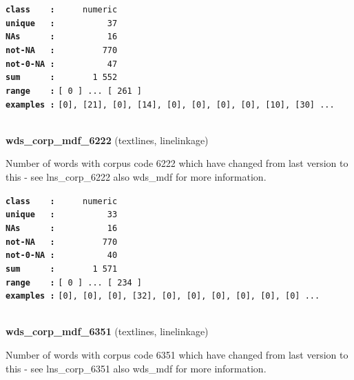\documentclass[]{article}
\begin{document}
\textbf{\texttt{class\ \ \ \ :}} \texttt{~~~~~numeric}\\
\textbf{\texttt{unique\ \ \ :}} \texttt{~~~~~~~~~~37}\\
\textbf{\texttt{NAs\ \ \ \ \ \ :}} \texttt{~~~~~~~~~~16}\\
\textbf{\texttt{not-NA\ \ \ :}} \texttt{~~~~~~~~~770}\\
\textbf{\texttt{not-0-NA\ :}} \texttt{~~~~~~~~~~47}\\
\textbf{\texttt{sum\ \ \ \ \ \ :}} \texttt{~~~~~~~1~552}\\
\textbf{\texttt{range\ \ \ \ :}}
\texttt{{[}\ 0\ {]}\ ...\ {[}\ 261\ {]}}\\
\textbf{\texttt{examples\ :}}
\texttt{{[}0{]},\ {[}21{]},\ {[}0{]},\ {[}14{]},\ {[}0{]},\ {[}0{]},\ {[}0{]},\ {[}0{]},\ {[}10{]},\ {[}30{]}\ ...}\\

~

\textbf{wds\_corp\_mdf\_6222} (textlines, linelinkage)

Number of words with corpus code 6222 which have changed from last
version to this - see lns\_corp\_6222 also wds\_mdf for more
information.

\textbf{\texttt{class\ \ \ \ :}} \texttt{~~~~~numeric}\\
\textbf{\texttt{unique\ \ \ :}} \texttt{~~~~~~~~~~33}\\
\textbf{\texttt{NAs\ \ \ \ \ \ :}} \texttt{~~~~~~~~~~16}\\
\textbf{\texttt{not-NA\ \ \ :}} \texttt{~~~~~~~~~770}\\
\textbf{\texttt{not-0-NA\ :}} \texttt{~~~~~~~~~~40}\\
\textbf{\texttt{sum\ \ \ \ \ \ :}} \texttt{~~~~~~~1~571}\\
\textbf{\texttt{range\ \ \ \ :}}
\texttt{{[}\ 0\ {]}\ ...\ {[}\ 234\ {]}}\\
\textbf{\texttt{examples\ :}}
\texttt{{[}0{]},\ {[}0{]},\ {[}0{]},\ {[}32{]},\ {[}0{]},\ {[}0{]},\ {[}0{]},\ {[}0{]},\ {[}0{]},\ {[}0{]}\ ...}\\

~

\textbf{wds\_corp\_mdf\_6351} (textlines, linelinkage)

Number of words with corpus code 6351 which have changed from last
version to this - see lns\_corp\_6351 also wds\_mdf for more
information.
\end{document}
